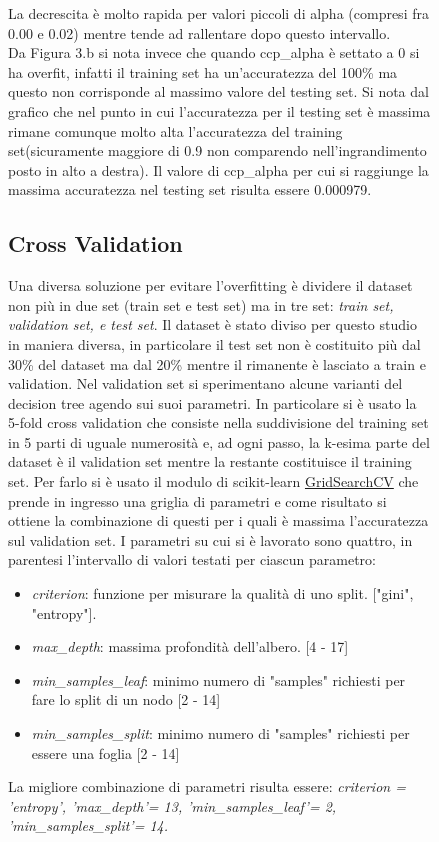 \documentclass[]{article}
\begin{document}
\begin{figure}

La decrescita è molto rapida per valori piccoli di alpha (compresi fra 0.00 e 0.02) mentre tende ad rallentare dopo questo intervallo.\\
Da Figura 3.b si nota invece che quando ccp\_alpha è settato a 0 si ha overfit, infatti il training set ha un'accuratezza del 100\% ma questo non corrisponde al massimo valore del testing set.
Si nota dal grafico che nel punto in cui l'accuratezza per il testing set è massima rimane comunque molto alta l'accuratezza del training set(sicuramente maggiore di 0.9 non comparendo nell'ingrandimento posto in alto a destra). Il valore di ccp\_alpha per cui si raggiunge la massima accuratezza nel testing set risulta essere 0.000979.

\subsection{Cross Validation}
Una diversa soluzione per evitare l'overfitting è dividere il dataset non più in due set (train set e test set) ma in tre set: \textit{train set, validation set, e test set}. Il dataset è stato diviso per questo studio in maniera diversa, in particolare il test set non è costituito più dal 30\% del dataset ma dal 20\% mentre il rimanente è lasciato a train e validation. Nel validation set si sperimentano alcune varianti del decision tree agendo sui suoi parametri. 
In particolare si è usato la 5-fold cross validation che consiste nella suddivisione del training set in 5 parti di uguale numerosità e, ad ogni passo, la k-esima parte del dataset è il validation set mentre la restante costituisce il training set. 
Per farlo si è usato il modulo di scikit-learn \href{https://scikit-learn.org/stable/modules/generated/sklearn.model_selection.GridSearchCV.html}{GridSearchCV} che prende in ingresso una griglia di parametri e come risultato si ottiene la combinazione di questi per i quali è massima l'accuratezza sul validation set. I parametri su cui si è lavorato sono quattro, in parentesi l'intervallo di valori testati per ciascun parametro:
\begin{itemize}
\item \textit{criterion}: funzione per misurare la qualità di uno split. ["gini", "entropy"].
\item \textit{max\_depth}: massima profondità dell'albero. [4 - 17]
\item \textit{min\_samples\_leaf}: minimo numero di "samples" richiesti per fare lo split di un nodo [2 - 14]
\item \textit{min\_samples\_split}: minimo numero di "samples" richiesti per essere una foglia [2 - 14]
\end{itemize}
La migliore combinazione di parametri risulta essere: \textit{criterion = 'entropy', 'max\_depth'= 13, 'min\_samples\_leaf'= 2, 'min\_samples\_split'= 14.}



\end{figure}
\end{document}
